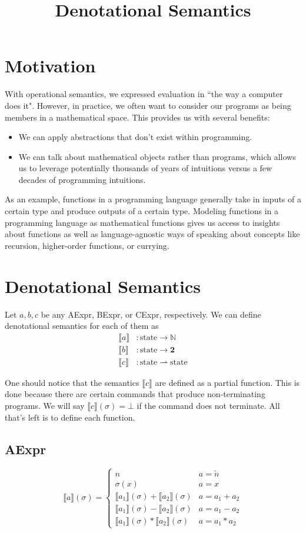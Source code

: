 \documentclass{lecturenotes}
\title{Denotational Semantics}
\newcommand{\funcdef}[4]{#1 \colon #2 #3 #4}
\newcommand{\totfunc}[3]{\funcdef{#1}{#2}{\rightarrow}{#3}}
\newcommand{\parfunc}[3]{\funcdef{#1}{#2}{\rightharpoonup}{#3}}
\newcommand{\sem}[1]{\llbracket #1 \rrbracket}
\newcommand{\semapp}[2]{\sem{#1}(#2)}
\newcommand{\semappsig}[1]{\semapp{#1}{\sigma}}
\begin{document}
\maketitle

\section{Motivation}
With operational semantics, we expressed evaluation in ``the way a computer does it".
However, in practice, we often want to consider our programs as being members in a mathematical space.
This provides us with several benefits:
\begin{itemize}
  \item We can apply abstractions that don't exist within programming.
  \item We can talk about mathematical objects rather than programs,
    which allows us to leverage potentially thousands of years of intuitions versus a few decades of programming intuitions.
\end{itemize}

As an example, functions in a programming language generally take in inputs of a certain type and produce outputs of a certain type.
Modeling functions in a programming language as mathematical functions gives us access to insights about functions as well as language-agnostic ways of speaking about concepts like recursion, higher-order functions, or currying.

\section{Denotational Semantics}
Let $a, b, c$ be any AExpr, BExpr, or CExpr, respectively.
We can define denotational semantics for each of them as
\begin{align*}
  \totfunc{\sem{a}&}{\text{state}}{\mathbb{N}}\\
  \totfunc{\sem{b}&}{\text{state}}{\textbf{2}}\\
  \parfunc{\sem{c}&}{\text{state}}{\text{state}}
\end{align*}

One should notice that the semantics $\sem{c}$ are defined as a partial function.
This is done because there are certain commands that produce non-terminating programs.
We will say $\semappsig{c} = \bot$ if the command does not terminate.
All that's left is to define each function.

\subsection{AExpr}
\[
  \semappsig{a} = \begin{cases}
    n & a = \widetilde{n}\\
    \sigma(x)  & a = x\\
    \semappsig{a_1} + \semappsig{a_2}  & a = a_1 + a_2\\
    \semappsig{a_1} - \semappsig{a_2}  & a = a_1 - a_2\\
    \semappsig{a_1} * \semappsig{a_2}  & a = a_1 * a_2
  \end{cases}
\]
\end{document}
